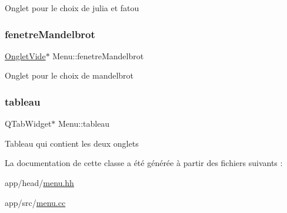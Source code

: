 Onglet pour le choix de julia et fatou \mbox{\label{classMenu_a0cb5416b7f7266693059c3f8038aaba3}} 
\subsubsection{\texorpdfstring{fenetre\+Mandelbrot}{fenetreMandelbrot}}
{\footnotesize\ttfamily \hyperlink{classOngletVide}{Onglet\+Vide}$\ast$ Menu\+::fenetre\+Mandelbrot\hspace{0.3cm}{\ttfamily [private]}}

Onglet pour le choix de mandelbrot \mbox{\label{classMenu_afe56e53267ccb7f91c2d8e52c8504ef2}} 
\subsubsection{\texorpdfstring{tableau}{tableau}}
{\footnotesize\ttfamily Q\+Tab\+Widget$\ast$ Menu\+::tableau\hspace{0.3cm}{\ttfamily [private]}}

Tableau qui contient les deux onglets 

La documentation de cette classe a été générée à partir des fichiers suivants \+:\begin{DoxyCompactItemize}
\item 
app/head/\hyperlink{menu_8hh}{menu.\+hh}\item 
app/src/\hyperlink{menu_8cc}{menu.\+cc}\end{DoxyCompactItemize}
